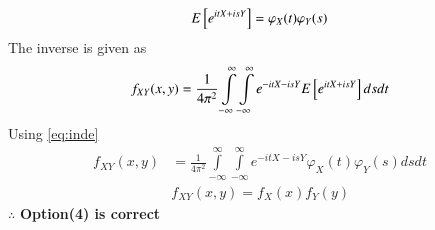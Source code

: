\documentclass[journal,12pt,twocolumn]{IEEEtran}
\begin{document}
\begin{enumerate}
\begin{align}
E{}\left[e^{itX+isY}\right]=\varphi_X(t)\varphi_Y(s) \label{eq:inde}
\end{align}
The inverse is given as
\begin{align}
f_{XY}(x,y)=\frac{1}{4\pi^2}\displaystyle \int\limits_{-\infty}^{\infty} \int\limits_{-\infty}^{\infty} e^{-itX-isY}E{}\left[e^{itX+isY}\right]ds dt
\end{align}
Using \eqref{eq:inde}
\begin{align}
f_{XY}(x,y)&=\frac{1}{4\pi^2}\displaystyle \int\limits_{-\infty}^{\infty} \int\limits_{-\infty}^{\infty} e^{-itX-isY}\varphi_X(t)\varphi_Y(s) ds dt\\
&f_{XY}(x,y)=f_X(x)f_Y(y)
\end{align}
$\therefore$ \textbf{Option(4) is correct}
\end{enumerate}
\end{document}
